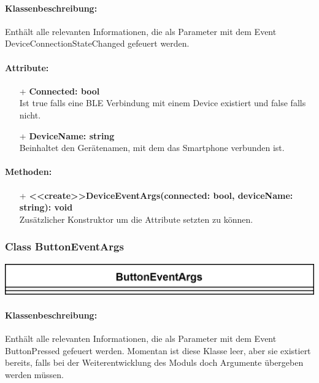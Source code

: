 \documentclass[a4paper,12pt]{article}
\begin{document}
\paragraph{Klassenbeschreibung:}
Enthält alle relevanten Informationen, die als Parameter mit dem Event DeviceConnectionStateChanged gefeuert werden.

\paragraph{Attribute:}
\begin{itemize}
	\item[+] \textbf{Connected: bool}\\Ist true falls eine BLE Verbindung mit einem Device existiert und false falls nicht.
	\item[+] \textbf{DeviceName: string}\\Beinhaltet den Gerätenamen, mit dem das Smartphone verbunden ist. 
\end{itemize}

\paragraph{Methoden:}
\begin{itemize}
	\item[+] \textbf{<<create>>DeviceEventArgs(connected: bool, deviceName: string): void}\\ Zusätzlicher Konstruktor um die Attribute setzten zu können.
\end{itemize}

\begin{minipage}[b]{0.5\textwidth}
	\subsubsection{Class ButtonEventArgs}
	
	\end{minipage}
	\begin{minipage}[c]{0.5\textwidth}
	\includegraphics[width=\textwidth]{bilder/BibPackageKlassen/ButtonEventArgs.png}
\end{minipage}
\paragraph{Klassenbeschreibung:}
Enthält alle relevanten Informationen, die als Parameter mit dem Event ButtonPressed gefeuert werden. Momentan ist diese Klasse leer, aber sie existiert bereits, falls bei der Weiterentwicklung des Moduls doch Argumente übergeben werden müssen.\\
\end{document}
